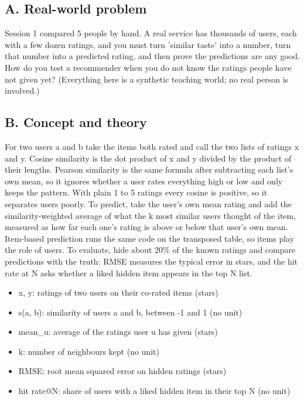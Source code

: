 \documentclass[11pt,a4paper]{article}
\begin{document}
\subsection*{A. Real-world problem}
Session 1 compared 5 people by hand. A real service has thousands of users, each with a few dozen ratings, and you must turn 'similar taste' into a number, turn that number into a predicted rating, and then prove the predictions are any good. How do you test a recommender when you do not know the ratings people have not given yet? (Everything here is a synthetic teaching world; no real person is involved.)

\subsection*{B. Concept and theory}
For two users a and b take the items both rated and call the two lists of ratings x and y. Cosine similarity is the dot product of x and y divided by the product of their lengths. Pearson similarity is the same formula after subtracting each list's own mean, so it ignores whether a user rates everything high or low and only keeps the pattern. With plain 1 to 5 ratings every cosine is positive, so it separates users poorly. To predict, take the user's own mean rating and add the similarity-weighted average of what the k most similar users thought of the item, measured as how far each one's rating is above or below that user's own mean. Item-based prediction runs the same code on the transposed table, so items play the role of users. To evaluate, hide about 20\% of the known ratings and compare predictions with the truth: RMSE measures the typical error in stars, and the hit rate at N asks whether a liked hidden item appears in the top N list.

\begin{itemize}[nosep]
\item x, y: ratings of two users on their co-rated items (stars)
\item s(a, b): similarity of users a and b, between -1 and 1 (no unit)
\item mean\_u: average of the ratings user u has given (stars)
\item k: number of neighbours kept (no unit)
\item RMSE: root mean squared error on hidden ratings (stars)
\item hit rate@N: share of users with a liked hidden item in their top N (no unit)
\end{itemize}
\end{document}
